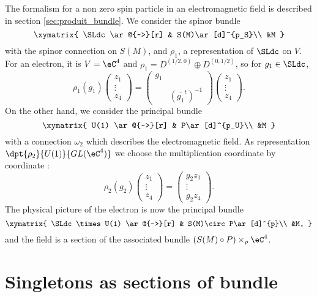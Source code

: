 The formalism for a non zero spin particle in an electromagnetic field is described in section \ref{sec:produit_bundle}. We consider the spinor bundle
\[
\xymatrix{
    \SLdc \ar@{~>}[r] & S(M)\ar[d]^{p_S}\\ &M 
  }
\]
with the spinor connection on $S(M)$, and $\rho_1$, a representation of $\SLdc$ on $V$. For an electron, it is $V=\eC^4$ and $\rho_1=D^{(1/2,0)}\oplus D^{(0,1/2)}$, so for $g_1\in\SLdc$,
\begin{equation}
  \rho_1(g_1)\begin{pmatrix}
  z_1\\\vdots\\z_4
             \end{pmatrix}
=
\begin{pmatrix}
  g_1\\\\
&(\overline{g_1}^t)^{-1}
\end{pmatrix}
\begin{pmatrix}
  z_1\\\vdots\\z_4
             \end{pmatrix}.
\end{equation}
On the other hand, we consider the principal bundle
\[
\xymatrix{
    U(1) \ar@{~>}[r] & P\ar[d]^{p_U}\\ &M 
  }
\]
with a connection $\omega_2$ which describes the electromagnetic field. As representation $\dpt{\rho_2}{U(1)}{GL(\eC^4)}$ we choose the multiplication coordinate by coordinate :
\begin{equation}
\rho_2(g_2)\begin{pmatrix}
  z_1\\\vdots\\z_4
             \end{pmatrix}
=
\begin{pmatrix}
  g_2z_1\\\vdots\\g_2z_4
             \end{pmatrix}.
\end{equation}
The physical picture of the electron is now the principal bundle
\[
\xymatrix{
    \SLdc\times U(1) \ar@{~>}[r] & S(M)\circ P\ar[d]^{p}\\ &M,
  }
\]
and the field is a section of the associated bundle $(S(M)\circ P)\times_{\rho}\eC^4$.

\section{Singletons as sections of bundle}
\label{SecUKPhZVd}

